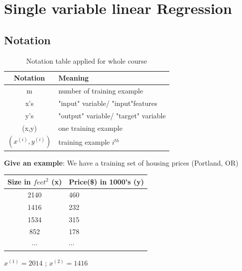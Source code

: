 \section{Single variable linear Regression}
\subsection{Notation}
\begin{table}[htb]
	\begin{center}
		\begin{tabular}[h]{ c | l }
			
			\textbf{Notation}    & \textbf{Meaning}\\ \midrule
			m 			 			 	 & number of training example \\ 
			x's    		 				 & "input" variable/ "input"features \\
			y's  		 				 & "output" variable/ "target" variable \\
			(x,y) 						& one training example \\
			$(x^{(i)}, y^{(i)})$    & training example $i^{th}$ \\
			
		\end{tabular}
		\caption{Notation table applied for whole course} \label{tab.notation}
	\end{center}
\end{table}
\vspace*{1mm}
\textbf{Give an example}:
We have a training set of housing prices (Portland, OR)
\begin{table}[htb]
	\begin{center}
		\begin{tabular}[h]{ c | l }	
			\textbf{Size in $feet^2$ (x)}    & \textbf{Price(\$) in 1000's (y)}\\ \midrule
			2140 			 			 	 & 460 \\ 
			1416   		 				 & 232 \\
			1534  		 				 & 315 \\
			852 						& 178 \\
			$ \cdots $   & $\cdots$\\	
		\end{tabular}
	\end{center}
\end{table}

$x^{(1)} = 2014$ ; $x^{(2)} = 1416$ \\
